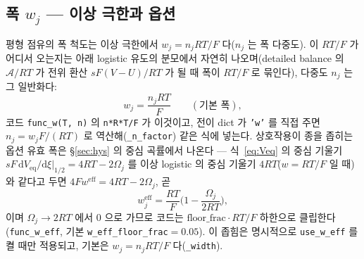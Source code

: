 \documentclass[11pt,a4paper]{article}
\newcommand{\dd}{\mathrm{d}}
\newcommand{\eff}{\mathrm{eff}}
\newcommand{\eq}{\mathrm{eq}}
\newcommand{\code}[1]{\texttt{#1}}
\begin{document}
\subsection{폭 $w_j$ — 이상 극한과 옵션}
평형 점유의 폭 척도는 이상 극한에서 $w_j=n_jRT/F$ 다($n_j$ 는 폭 다중도). 이 $RT/F$ 가 어디서 오는지는 아래
logistic 유도의 분모에서 자연히 나오며(detailed balance 의 $\mathcal A/RT$ 가 전위 환산 $sF(V-U)/RT$ 가 될 때 폭이
$RT/F$ 로 묶인다), 다중도 $n_j$ 는 그 일반화다:
\begin{equation}
w_j=\frac{n_jRT}{F}\qquad(\text{기본 폭}),
\label{eq:wbase}
\end{equation}
코드 \code{func\_w(T, n)} 의 \code{n*R*T/F} 가 이것이고, 전이 dict 가 \code{'w'} 를 직접 주면 $n_j=w_jF/(RT)$ 로
역산해(\code{\_n\_factor}) 같은 식에 넣는다. 상호작용이 종을 좁히는 옵션 유효 폭은 \S\ref{sec:hys} 의 중심 곡률에서
나온다 — 식~\eqref{eq:Veq} 의 중심 기울기 $sF\,\dd V_\eq/\dd\xi|_{1/2}=4RT-2\Omega_j$ 를 이상 logistic 의 중심 기울기
$4RT$($w=RT/F$ 일 때)와 같다고 두면 $4Fw^\eff=4RT-2\Omega_j$, 곧
\begin{equation}
w_j^\eff=\frac{RT}{F}\Big(1-\frac{\Omega_j}{2RT}\Big),
\label{eq:weff}
\end{equation}
이며 $\Omega_j\to2RT$ 에서 $0$ 으로 가므로 코드는 $\mathrm{floor\_frac}\cdot RT/F$ 하한으로 클립한다(\code{func\_w\_eff},
기본 \code{w\_eff\_floor\_frac}$=0.05$). 이 좁힘은 명시적으로 \code{use\_w\_eff} 를 켤 때만 적용되고, 기본은
$w_j=n_jRT/F$ 다(\code{\_width}).
\end{document}
